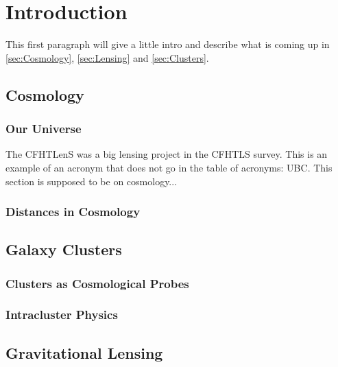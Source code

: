
\chapter{Introduction}
\label{ch:Introduction}

This first paragraph will give a little intro and describe what is coming up in \autoref{sec:Cosmology}, \autoref{sec:Lensing} and \autoref{sec:Clusters}.

\section{Cosmology}
\label{sec:Cosmology}

\subsection{Our Universe}

The \acf{CFHTLenS} was a big lensing project in the \acf{CFHTLS} survey. This is an example of an acronym that does not go in the table of acronyms:  \acs{UBC}. This section is supposed to be on cosmology...

\subsection{Distances in Cosmology}

\section{Galaxy Clusters}
\label{sec:Clusters}

\subsection{Clusters as Cosmological Probes}

\subsection{Intracluster Physics}

\section{Gravitational Lensing}
\label{sec:Lensing}

